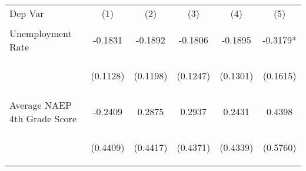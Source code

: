 \begin{center}
\begin{tabular}{lccccc}
\hline \noalign{\smallskip}Dep Var & (1) & (2) & (3) & (4) & (5)\\
\noalign{\smallskip}\hline \noalign{\smallskip}Unemployment Rate & \begin{scriptsize}-0.1831\end{scriptsize} & \begin{scriptsize}-0.1892\end{scriptsize} & \begin{scriptsize}-0.1806\end{scriptsize} & \begin{scriptsize}-0.1895\end{scriptsize} & \begin{scriptsize}-0.3179*\end{scriptsize}\\
 & \begin{scriptsize}(0.1128)\end{scriptsize} & \begin{scriptsize}(0.1198)\end{scriptsize} & \begin{scriptsize}(0.1247)\end{scriptsize} & \begin{scriptsize}(0.1301)\end{scriptsize} & \begin{scriptsize}(0.1615)\end{scriptsize}\\
\noalign{\smallskip}Average NAEP 4th Grade Score & \begin{scriptsize}-0.2409\end{scriptsize} & \begin{scriptsize}0.2875\end{scriptsize} & \begin{scriptsize}0.2937\end{scriptsize} & \begin{scriptsize}0.2431\end{scriptsize} & \begin{scriptsize}0.4398\end{scriptsize}\\
 & \begin{scriptsize}(0.4409)\end{scriptsize} & \begin{scriptsize}(0.4417)\end{scriptsize} & \begin{scriptsize}(0.4371)\end{scriptsize} & \begin{scriptsize}(0.4339)\end{scriptsize} & \begin{scriptsize}(0.5760)\end{scriptsize}\\

\end{tabular}
\end{center}
